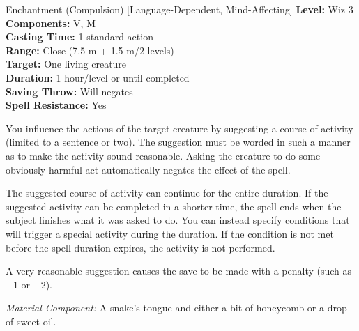 {Enchantment (Compulsion) [Language-Dependent, Mind-Affecting]}
{
	\textbf{Level:}
	Wiz 3\\
	\textbf{Components:}
	V, M\\
	\textbf{Casting Time:}
	1 standard action\\
	\textbf{Range:}
	Close (7.5 m + 1.5 m/2 levels)\\
	\textbf{Target:}
	One living creature\\
	\textbf{Duration:}
	1 hour/level or until completed\\
	\textbf{Saving Throw:}
	Will negates\\
	\textbf{Spell Resistance:}
	Yes\\
}
{
	You influence the actions of the target creature by suggesting a course of activity (limited to a sentence or two). The suggestion must be worded in such a manner as to make the activity sound reasonable. Asking the creature to do some obviously harmful act automatically negates the effect of the spell.

	The suggested course of activity can continue for the entire duration. If the suggested activity can be completed in a shorter time, the spell ends when the subject finishes what it was asked to do. You can instead specify conditions that will trigger a special activity during the duration. If the condition is not met before the spell duration expires, the activity is not performed.

	A very reasonable suggestion causes the save to be made with a penalty (such as $-1$ or $-2$).

	\textit{Material Component:}
	A snake's tongue and either a bit of honeycomb or a drop of sweet oil.

}
